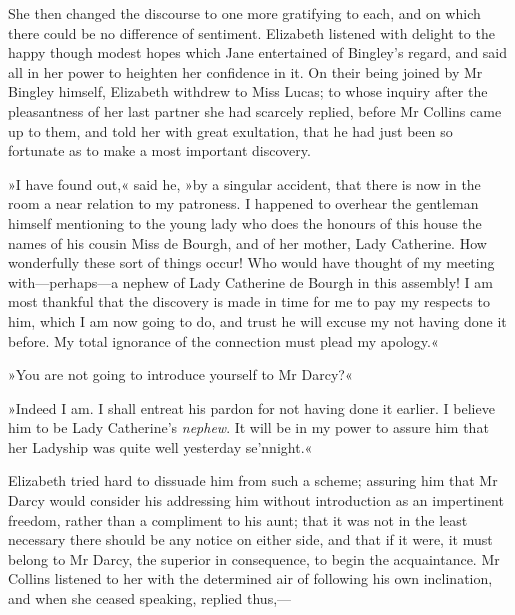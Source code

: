 She then changed the discourse to one more gratifying to each, and on which there could be no difference of sentiment. Elizabeth listened with delight to the happy though modest hopes which Jane entertained of Bingley's regard, and said all in her power to heighten her confidence in it. On their being joined by Mr Bingley himself, Elizabeth withdrew to Miss Lucas; to whose inquiry after the pleasantness of her last partner she had scarcely replied, before Mr Collins came up to them, and told her with great exultation, that he had just been so fortunate as to make a most important discovery.

»I have found out,« said he, »by a singular accident, that there is now in the room a near relation to my patroness. I happened to overhear the gentleman himself mentioning to the young lady who does the honours of this house the names of his cousin Miss de Bourgh, and of her mother, Lady Catherine. How wonderfully these sort of things occur! Who would have thought of my meeting with—perhaps—a nephew of Lady Catherine de Bourgh in this assembly! I am most thankful that the discovery is made in time for me to pay my respects to him, which I am now going to do, and trust he will excuse my not having done it before. My total ignorance of the connection must plead my apology.«

»You are not going to introduce yourself to Mr Darcy?«

»Indeed I am. I shall entreat his pardon for not having done it earlier. I believe him to be Lady Catherine's \textit{nephew}. It will be in my power to assure him that her Ladyship was quite well yesterday se'nnight.«

Elizabeth tried hard to dissuade him from such a scheme; assuring him that Mr Darcy would consider his addressing him without introduction as an impertinent freedom, rather than a compliment to his aunt; that it was not in the least necessary there should be any notice on either side, and that if it were, it must belong to Mr Darcy, the superior in consequence, to begin the acquaintance. Mr Collins listened to her with the determined air of following his own inclination, and when she ceased speaking, replied thus,—

